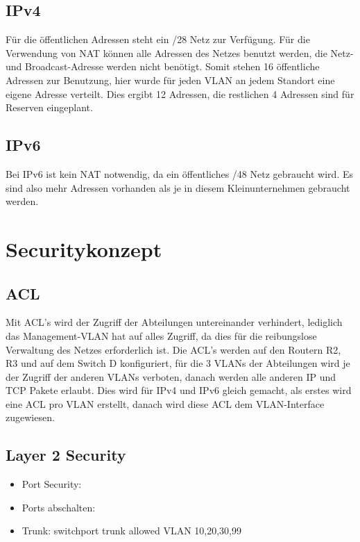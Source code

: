 \documentclass[11pt,a4paper]{scrreprt}
\begin{document}
\subsection{IPv4}
Für die öffentlichen Adressen steht ein /28 Netz zur Verfügung. Für die Verwendung von \acs{NAT} können alle Adressen des Netzes benutzt werden, die Netz- und Broadcast-Adresse werden nicht benötigt. Somit stehen 16 öffentliche Adressen zur Benutzung, hier wurde für jeden \acs{VLAN} an jedem Standort eine eigene Adresse verteilt. Dies ergibt 12 Adressen, die restlichen 4 Adressen sind für Reserven eingeplant.

\subsection{IPv6}
Bei IPv6 ist kein \acs{NAT} notwendig, da ein öffentliches /48 Netz gebraucht wird. Es sind also mehr Adressen vorhanden als je in diesem Kleinunternehmen gebraucht werden.

\newpage
\section{Securitykonzept} 
\subsection{ACL} \label{acl}
Mit \acs{ACL}'s wird der Zugriff der Abteilungen untereinander verhindert, lediglich das Management-\acs{VLAN} hat auf alles Zugriff, da dies für die reibungslose Verwaltung des Netzes erforderlich ist.
Die \acs{ACL}'s werden auf den Routern R2, R3 und auf dem Switch D konfiguriert, für die 3 \acs{VLAN}s der Abteilungen wird je der Zugriff der anderen \acs{VLAN}s verboten, danach werden alle anderen IP und TCP Pakete erlaubt. Dies wird für IPv4 und IPv6 gleich gemacht, als erstes wird eine ACL pro \acs{VLAN} erstellt, danach wird diese \acs{ACL} dem \acs{VLAN}-Interface zugewiesen.

\subsection{Layer 2 Security}
\begin{itemize}
\item Port Security: 
\item Ports abschalten: 
\item Trunk: switchport trunk allowed \acs{VLAN} 10,20,30,99
\end{itemize}
\end{document}
